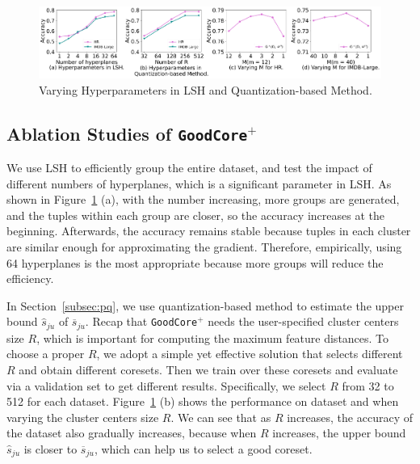 
\begin{figure}
	\centering
	\includegraphics[width=1\textwidth]{figs/M}
	\vspace{-1em}
	\caption{Varying Hyperparameters in LSH and Quantization-based Method.}
	\label{fig:pq-exp}
	\vspace{-1em}
\end{figure}

\subsection{Ablation Studies of \texttt{GoodCore}$^+$}
%
We use LSH to efficiently group the entire dataset, and test the impact of  different numbers of hyperplanes, which is a significant parameter in LSH.
 As shown in Figure~\ref{fig:pq-exp} (a), with the number increasing, more groups are generated, and the tuples within each group are closer, so the  accuracy increases at the beginning. Afterwards, the accuracy remains stable because tuples in each cluster are similar enough for  approximating the gradient. Therefore, empirically, using  64 hyperplanes is the most appropriate because more groups will reduce the efficiency.

 In Section~\ref{subsec:pq}, we use quantization-based method to estimate the upper bound $\hat{s}_{ju}$ of $\overline{s}_{ju}$. Recap that \texttt{GoodCore}$^+$ needs the user-specified cluster centers size $R$, which is important for computing the maximum feature distances.
%
 To choose a proper $R$, we adopt a simple yet effective solution that selects different $R$ and obtain different coresets. Then we train over these coresets and evaluate via a validation set to get different results. Specifically, we select $R$ from 32 to 512 for each dataset. Figure~\ref{fig:pq-exp} (b) shows the performance on dataset \hr and \imdbl when varying the cluster centers size $R$.  We can see that as $R$ increases, the accuracy of the dataset also gradually increases, because when $R$ increases, the upper bound $\hat{s}_{ju}$ is closer to $\overline{s}_{ju}$, which can help us to select a good coreset.


